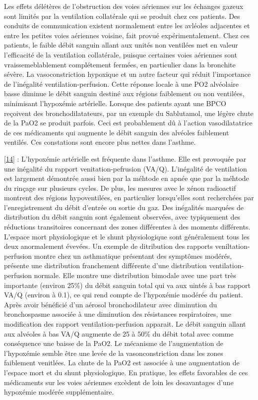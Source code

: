 \documentclass[12pt,]{article}
\begin{document}
Les effets délétères de l'obstruction des voies aériennes sur les
échanges gazeux sont limités par la ventilation collatérale qui se
produit chez ces patients. Des conduits de communication existent
normalement entre les avléoles adjacentes et entre les petites voies
aériennes voisine, fait provué expérimentalement. Chez ces patients, le
faible débit sanguin allant aux unités non ventilées met en valeur
l'efficacité de la ventilation collatérale, puisque certaines voies
aériennes sont vraissemeblablement complétement fermées, en particulier
dans la bronchite sévère. La vasoconstriction hypoxique et un autre
facteur qui réduit l'importance de l'inégalité ventilation-perfusion.
Cette réponse locale à une PO2 alvéolaire basse diminue le débit sanguin
destiné aux régions faiblement ou non ventilées, minimisant l'hypoxémie
artérielle. Lorsque des patients ayant une BPCO reçoivent des
bronchodilatateurs, par un exemple du Sablutamol, une légère chute de la
PaO2 se produit parfois. Ceci est probablement dû à l'action
vasodilatatrice de ces médicaments qui augmente le débit sanguin des
alvéoles faiblement ventilés. Ces constations sont encore plus nettes
dans l'asthme.

{[}\protect\hyperlink{ref-wagner1978ventilation}{14}{]} : L'hypoxémie
artérielle est fréquente dans l'asthme. Elle est provoquée par une
inégalité du rapport venitation-pefrusion (VA/Q). L'inégalité de
ventilation est largement démontrée aussi bien par la méhtode en apnée
que par la méhtode du rinçage sur plusieurs cycles. De plus, les mesures
avec le xénon radioactif montrent des régions hypoventilées, en
particulier lorsqu'elles sont recherchées par l'enregistrement du débit
d'entrée ou sortie du gaz. Des inégalités marquées de distribution du
débit sanguin sont également observées, avec typiquement des réductions
transitoires concernant des zones différentes à des moments différents.
L'espace mort physiologique et le shunt physiologique sont généralement
tous les deux anormalement évevées. Un exemple de ditribution des
rapports veniltation-perfusion montre chez un asthmatique présentant des
symptômes modérés, présente une distribution franchement différente
d'une distribution ventilation-perfusion normale. Elle montre une
distribution bimodale avec une part très importante (environ 25\%) du
débit sanguin total qui va aux uintés à bas rapport VA/Q (environ à
0.1), ce qui rend compte de l'hypoxémie modérée du patient. Après avoir
bénéficié d'un aérosol bronchodilateur avec diminution du bronchospasme
associée à une diminution des résistances respiratoires, une
modification des rapport ventilation-perfusion apparait. Le débit
sanguin allant aux alvéoles à bas VA/Q augmente de 25 à 50\% du débit
total avec comme conséquence une baisse de la PaO2. Le mécanisme de
l'augmentation de l'hypoxémie semble être une levée de la
vasonconstriction dans les zones faiblement venitlées. La chute de la
PaO2 est associée à une augmentation de l'espace mort et du shunt
physiologique. En pratique, les effets favorables de ces médicaments sur
les voies aériennes excèdent de loin les desavantages d'une hypoxémie
modérée supplémentaire.
\end{document}
